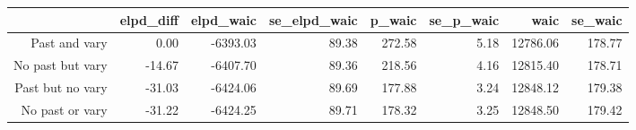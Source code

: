 \begin{table}[ht]
\centering
\begin{tabular}{rrrrrrrr}
  \hline
 & elpd\_diff & elpd\_waic & se\_elpd\_waic & p\_waic & se\_p\_waic & waic & se\_waic \\ 
  \hline
Past and vary & 0.00 & -6393.03 & 89.38 & 272.58 & 5.18 & 12786.06 & 178.77 \\ 
  No past but vary & -14.67 & -6407.70 & 89.36 & 218.56 & 4.16 & 12815.40 & 178.71 \\ 
  Past but no vary & -31.03 & -6424.06 & 89.69 & 177.88 & 3.24 & 12848.12 & 179.38 \\ 
  No past or vary & -31.22 & -6424.25 & 89.71 & 178.32 & 3.25 & 12848.50 & 179.42 \\ 
   \hline
\end{tabular}
\end{table}
